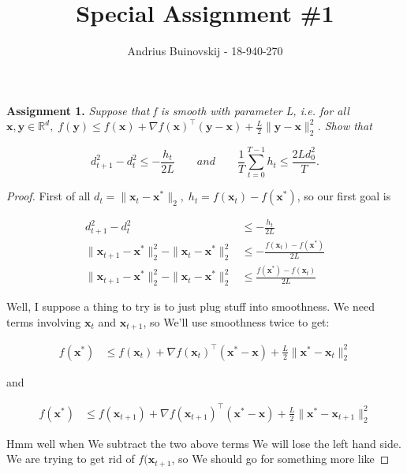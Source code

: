 \documentclass{article}
\begin{document}
\title{Special Assignment \#1}
\author{Andrius Buinovskij - 18-940-270}
\date{}

\maketitle

\textbf{Assignment 1.} \textit{Suppose that f is smooth with parameter L, i.e. for all $\mathbf{x, y}\in\mathbb{R}^d,\; f(\mathbf{y})\le f(\mathbf{x}) + \nabla  f(\mathbf{x})^\top (\mathbf{y}-\mathbf{x}) + \frac{L}{2}\|\mathbf{y-x}\|^2_2$. Show that}

\[ d^2_{t+1} - d^2_t \le -\frac{h_t}{2L}\qquad and\qquad \frac{1}{T}\sum^{T-1}_{t=0}h_t \le \frac{2Ld^2_0}{T}. \]

\begin{proof}
	First of all $d_{t} = \|\mathbf{x}_t-\mathbf{x}^*\|_2,\; h_t = f(\mathbf{x}_t) - f(\mathbf{x^*})$, so our first goal is 
	
	\begin{align}
		 d^2_{t+1} - d^2_t &\le - \frac{h_t}{2L}\\
		 \|\mathbf{x}_{t+1} - \mathbf{x}^*\|_2^2 - \|\mathbf{x}_t-\mathbf{x}^*\|_2^2 &\le - \frac{f(\mathbf{x}_t) - f(\mathbf{x}^*)}{2L}\\
		 \|\mathbf{x}_{t+1} - \mathbf{x}^*\|_2^2 - \|\mathbf{x}_t-\mathbf{x}^*\|_2^2 &\le \frac{ f(\mathbf{x}^*) - f(\mathbf{x}_t)}{2L}
	\end{align}
	
	Well, I suppose a thing to try is to just plug stuff into smoothness. We need terms involving $\mathbf{x}_t$ and $\mathbf{x}_{t+1}$, so We'll use smoothness twice to get:
	
	\begin{align}
		f(\mathbf{x}^*) &\le f(\mathbf{x}_t) + \nabla  f(\mathbf{x}_t)^\top (\mathbf{x}^*-\mathbf{x}) + \frac{L}{2}\|\mathbf{x}^*-\mathbf{x}_t\|^2_2
	\end{align}
	
	and
	
	\begin{align}
		f(\mathbf{x}^*) &\le f(\mathbf{x}_{t+1}) + \nabla  f(\mathbf{x}_{t+1})^\top (\mathbf{x}^*-\mathbf{x}) + \frac{L}{2}\|\mathbf{x}^*-\mathbf{x}_{t+1}\|^2_2
	\end{align}
	
	Hmm well when We subtract the two above terms We will lose the left hand side. We are trying to get rid of $f(\mathbf{x}_{t+1}$, so We should go for something more like
	

\end{proof}
\end{document}
